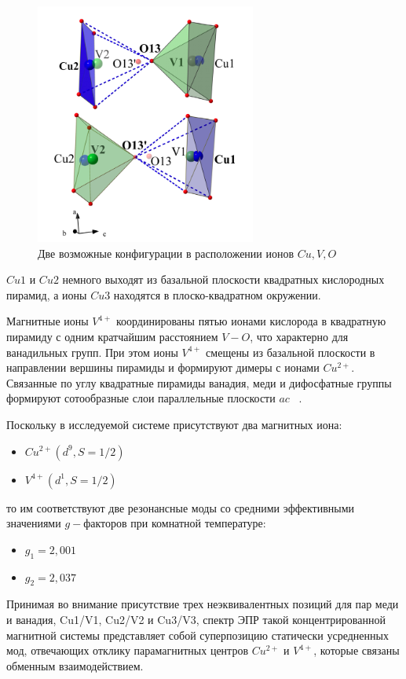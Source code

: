 \documentclass[11pt]{article}
\begin{document}
\begin{figure}[htp]
\centering
\includegraphics[scale=0.7]{CsCuVOP2O72_3}
\caption {Две возможные конфигурации в расположении ионов $Cu, V, O$  ~\cite{shvanskaya2015}}
\label{}
\end{figure}

$Cu1$ и $Cu2$ немного выходят из базальной плоскости квадратных кислородных пирамид, а ионы $Cu3$ находятся в плоско-квадратном окружении. 

Магнитные ионы $V^{4+}$ координированы пятью ионами кислорода в квадратную пирамиду с одним кратчайшим расстоянием $V-O$, что характерно для ванадильных групп. При этом ионы $V^{4+}$ смещены из базальной плоскости в направлении вершины пирамиды и формируют димеры с ионами $Cu^{2+}$. Связанные по углу квадратные пирамиды ванадия, меди и дифосфатные группы формируют сотообразные слои параллельные плоскости $ac$ ~\cite{nm}.

Поскольку в исследуемой системе присутствуют два магнитных иона:
\begin{itemize} 
\item  $Cu^{2+}(d^9, S=1/2)$
\item  $V^{4+}(d^1, S=1/2)$
\end{itemize} 

то им соответствуют две резонансные моды со средними эффективными значениями $g-$факторов при комнатной температуре: 

\begin{itemize} 
\item $g_1=2,001$
\item $g_2=2,037$
\end{itemize} 

Принимая во внимание присутствие трех неэквивалентных позиций для пар меди и ванадия, Cu1/V1, Cu2/V2 и Cu3/V3, спектр ЭПР такой концентрированной магнитной системы представляет собой суперпозицию статически усредненных мод, отвечающих отклику парамагнитных центров $Cu^{2+}$ и $V^{4+}$, которые связаны обменным взаимодействием.
\end{document}
